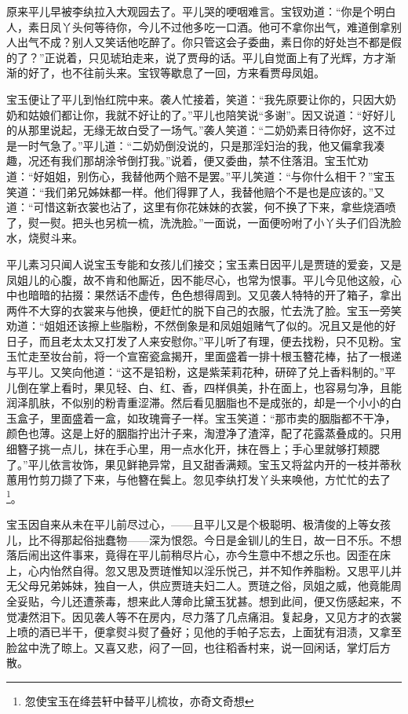 \documentclass[12pt,oneside]{book}
\begin{document}
原来平儿早被李纨拉入大观园去了。平儿哭的哽咽难言。宝钗劝道：“你是个明白人，素日凤丫头何等待你，今儿不过他多吃一口酒。他可不拿你出气，难道倒拿别人出气不成？别人又笑话他吃醉了。你只管这会子委曲，素日你的好处岂不都是假的了？”正说着，只见琥珀走来，说了贾母的话。平儿自觉面上有了光辉，方才渐渐的好了，也不往前头来。宝钗等歇息了一回，方来看贾母凤姐。

宝玉便让了平儿到怡红院中来。袭人忙接着，笑道：“我先原要让你的，只因大奶奶和姑娘们都让你，我就不好让的了。”平儿也陪笑说“多谢”。因又说道：“好好儿的从那里说起，无缘无故白受了一场气。”袭人笑道：“二奶奶素日待你好，这不过是一时气急了。”平儿道：“二奶奶倒没说的，只是那淫妇治的我，他又偏拿我凑趣，况还有我们那胡涂爷倒打我。”说着，便又委曲，禁不住落泪。宝玉忙劝道：“好姐姐，别伤心，我替他两个赔不是罢。”平儿笑道：“与你什么相干？”宝玉笑道：“我们弟兄姊妹都一样。他们得罪了人，我替他赔个不是也是应该的。”又道：“可惜这新衣裳也沾了，这里有你花妹妹的衣裳，何不换了下来，拿些烧酒喷了，熨一熨。把头也另梳一梳，洗洗脸。”一面说，一面便吩咐了小丫头子们舀洗脸水，烧熨斗来。

平儿素习只闻人说宝玉专能和女孩儿们接交；宝玉素日因平儿是贾琏的爱妾，又是凤姐儿的心腹，故不肯和他厮近，因不能尽心，也常为恨事。平儿今见他这般，心中也暗暗的拈掇：果然话不虚传，色色想得周到。又见袭人特特的开了箱子，拿出两件不大穿的衣裳来与他换，便赶忙的脱下自己的衣服，忙去洗了脸。宝玉一旁笑劝道：“姐姐还该擦上些脂粉，不然倒象是和凤姐姐赌气了似的。况且又是他的好日子，而且老太太又打发了人来安慰你。”平儿听了有理，便去找粉，只不见粉。宝玉忙走至妆台前，将一个宣窑瓷盒揭开，里面盛着一排十根玉簪花棒，拈了一根递与平儿。又笑向他道：“这不是铅粉，这是紫茉莉花种，研碎了兑上香料制的。”平儿倒在掌上看时，果见轻、白、红、香，四样俱美，扑在面上，也容易匀净，且能润泽肌肤，不似别的粉青重涩滞。然后看见胭脂也不是成张的，却是一个小小的白玉盒子，里面盛着一盒，如玫瑰膏子一样。宝玉笑道：“那市卖的胭脂都不干净，颜色也薄。这是上好的胭脂拧出汁子来，淘澄净了渣滓，配了花露蒸叠成的。只用细簪子挑一点儿，抹在手心里，用一点水化开，抹在唇上；手心里就够打颊腮了。”平儿依言妆饰，果见鲜艳异常，且又甜香满颊。宝玉又将盆内开的一枝并蒂秋蕙用竹剪刀撷了下来，与他簪在鬓上。忽见李纨打发丫头来唤他，方忙忙的去了\footnote{忽使宝玉在绛芸轩中替平儿梳妆，亦奇文奇想}。

宝玉因自来从未在平儿前尽过心，——且平儿又是个极聪明、极清俊的上等女孩儿，比不得那起俗拙蠢物——深为恨怨。今日是金钏儿的生日，故一日不乐。不想落后闹出这件事来，竟得在平儿前稍尽片心，亦今生意中不想之乐也。因歪在床上，心内怡然自得。忽又思及贾琏惟知以淫乐悦己，并不知作养脂粉。又思平儿并无父母兄弟姊妹，独自一人，供应贾琏夫妇二人。贾琏之俗，凤姐之威，他竟能周全妥贴，今儿还遭荼毒，想来此人薄命比黛玉犹甚。想到此间，便又伤感起来，不觉凄然泪下。因见袭人等不在房内，尽力落了几点痛泪。复起身，又见方才的衣裳上喷的酒已半干，便拿熨斗熨了叠好；见他的手帕子忘去，上面犹有泪渍，又拿至脸盆中洗了晾上。又喜又悲，闷了一回，也往稻香村来，说一回闲话，掌灯后方散。
\end{document}
